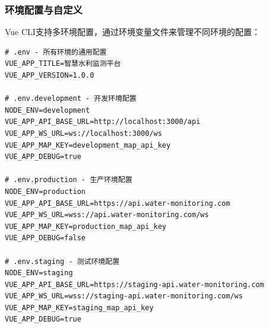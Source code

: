 \hypertarget{ux73afux5883ux914dux7f6eux4e0eux81eaux5b9aux4e49}{%
\subsubsection{环境配置与自定义}\label{ux73afux5883ux914dux7f6eux4e0eux81eaux5b9aux4e49}}

Vue CLI支持多环境配置，通过环境变量文件来管理不同环境的配置：


\begin{lstlisting}[style=terminal]
# .env - 所有环境的通用配置
VUE_APP_TITLE=智慧水利监测平台
VUE_APP_VERSION=1.0.0

# .env.development - 开发环境配置
NODE_ENV=development
VUE_APP_API_BASE_URL=http://localhost:3000/api
VUE_APP_WS_URL=ws://localhost:3000/ws
VUE_APP_MAP_KEY=development_map_api_key
VUE_APP_DEBUG=true

# .env.production - 生产环境配置
NODE_ENV=production
VUE_APP_API_BASE_URL=https://api.water-monitoring.com
VUE_APP_WS_URL=wss://api.water-monitoring.com/ws
VUE_APP_MAP_KEY=production_map_api_key
VUE_APP_DEBUG=false

# .env.staging - 测试环境配置
NODE_ENV=staging
VUE_APP_API_BASE_URL=https://staging-api.water-monitoring.com
VUE_APP_WS_URL=wss://staging-api.water-monitoring.com/ws
VUE_APP_MAP_KEY=staging_map_api_key
VUE_APP_DEBUG=true
\end{lstlisting}


